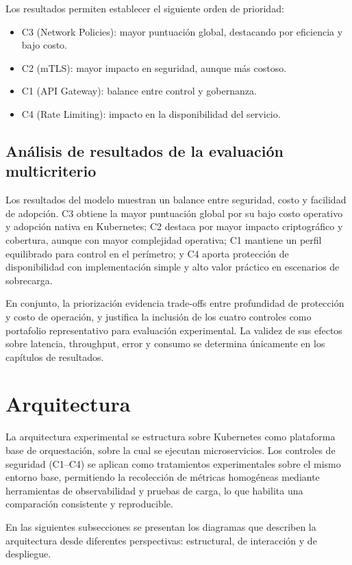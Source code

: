 Los resultados permiten establecer el siguiente orden de prioridad:

\begin{itemize}[noitemsep]
    \item C3 (Network Policies): mayor puntuación global, destacando por eficiencia y bajo costo.
    \item C2 (mTLS): mayor impacto en seguridad, aunque más costoso.
    \item C1 (API Gateway): balance entre control y gobernanza.
    \item C4 (Rate Limiting): impacto en la disponibilidad del servicio.
\end{itemize}

\subsection{Análisis de resultados de la evaluación multicriterio}

Los resultados del modelo muestran un balance entre seguridad, costo y facilidad de adopción. C3 obtiene la mayor puntuación global por su bajo costo operativo y adopción nativa en Kubernetes; C2 destaca por mayor impacto criptográfico y cobertura, aunque con mayor complejidad operativa; C1 mantiene un perfil equilibrado para control en el perímetro; y C4 aporta protección de disponibilidad con implementación simple y alto valor práctico en escenarios de sobrecarga.

En conjunto, la priorización evidencia trade-offs entre profundidad de protección y costo de operación, y justifica la inclusión de los cuatro controles como portafolio representativo para evaluación experimental. La validez de sus efectos sobre latencia, throughput, error y consumo se determina únicamente en los capítulos de resultados.

\section{Arquitectura}

La arquitectura experimental se estructura sobre Kubernetes como plataforma base de orquestación, sobre la cual se ejecutan microservicios. Los controles de seguridad (C1--C4) se aplican como tratamientos experimentales sobre el mismo entorno base, permitiendo la recolección de métricas homogéneas mediante herramientas de observabilidad y pruebas de carga, lo que habilita una comparación consistente y reproducible.

En las siguientes subsecciones se presentan los diagramas que describen la arquitectura desde diferentes perspectivas: estructural, de interacción y de despliegue.

